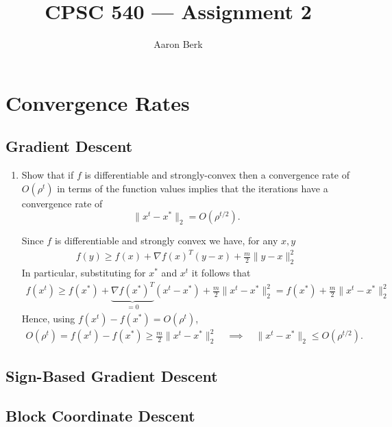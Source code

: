 \documentclass{article}
\title{CPSC 540 --- Assignment 2}
\author{Aaron Berk}
\begin{document}
\maketitle

\section{Convergence Rates}
\label{sec:convergence-rates}

\subsection{Gradient Descent}
\label{sec:gradient-descent}

\begin{enumerate}
\item Show that if  $f$ is differentiable and strongly-convex then a convergence rate of $O(\rho^t)$ in terms of the function values implies that the iterations have a convergence rate of
\[
\|x^t - x^*\|_2 = O(\rho^{t/2}).
\]

\soln

Since $f$ is differentiable and strongly convex we have, for any $x, y$
\begin{align*}
  f(y) \geq f(x) + \nabla f(x)^T(y-x) + \frac{m}{2} \|y-x\|_2^2
\end{align*}
In particular, substituting for $x^*$ and $x^t$ it follows that
\begin{align*}
  f(x^t) %
  \geq f(x^*) %
  + \underbrace{\nabla f(x^*)^T}_{=0} (x^t - x^*) %
  + \frac{m}{2} \|x^t - x^*\|_2^2 %
  = f(x^*) + \frac{m}{2} \|x^t - x^*\|_2^2
\end{align*}
Hence, using $f(x^t) - f(x^*) = O(\rho^t)$,
\begin{align*}
  O(\rho^t) = f(x^t) - f(x^*) \geq \frac{m}{2} \|x^t - x^*\|_2^2  %
  \quad \implies \quad %
  \|x^t - x^*\|_2 \leq O(\rho^{t/2}).
\end{align*}



\end{enumerate}

\subsection{Sign-Based Gradient Descent}
\label{sec:sign-based-gradient}

\subsection{Block Coordinate Descent}
\label{sec:block-coord-desc}
\end{document}
